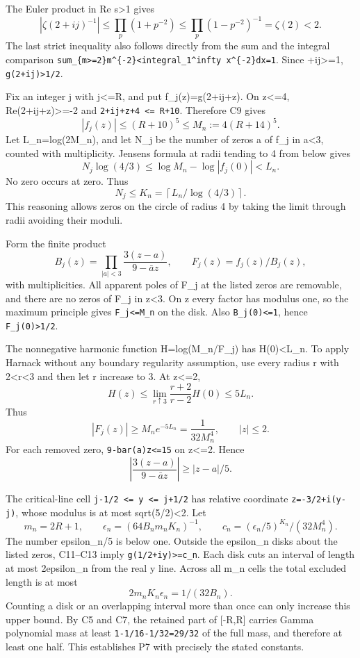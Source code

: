 \documentclass[11pt]{article}
\begin{document}
The Euler product in Re s\textgreater1 gives \[
|\zeta(2+ij)^{-1}|\le\prod_p(1+p^{-2})
 \le\prod_p(1-p^{-2})^{-1}=\zeta(2)<2.
\] The last strict inequality also follows directly from the sum and the integral comparison \texttt{sum\_\{m\textgreater{}=2\}m\^{}\{-2\}\textless{}integral\_1\^{}infty\ x\^{}\{-2\}dx=1}. Since +ij\textbar\textgreater=1, \texttt{\textbar{}g(2+ij)\textbar{}\textgreater{}1/2}.

Fix an integer j with \textbar j\textbar\textless=R, and put f\_j(z)=g(2+ij+z). On \textbar z\textbar\textless=4, Re(2+ij+z)\textgreater=-2 and \texttt{\textbar{}2+ij+z\textbar{}+4\ \textless{}=\ R+10}. Therefore C9 gives \[
|f_j(z)|\le(R+10)^5\le M_n:=4(R+14)^5.
\tag{C10}
\] Let L\_n=log(2M\_n), and let N\_j be the number of zeros a of f\_j in \textbar a\textbar\textless3, counted with multiplicity. Jensen\textquotesingle s formula at radii tending to 4 from below gives \[
N_j\log(4/3)\le\log M_n-\log|f_j(0)|<L_n.
\] No zero occurs at zero. Thus \[
N_j\le K_n=\left\lceil L_n/\log(4/3)\right\rceil.
\tag{C11}
\] This reasoning allows zeros on the circle of radius 4 by taking the limit through radii avoiding their moduli.

Form the finite product \[
B_j(z)=\prod_{|a|<3}\frac{3(z-a)}{9-\bar a z},
\qquad F_j(z)=f_j(z)/B_j(z),
\] with multiplicities. All apparent poles of F\_j at the listed zeros are removable, and there are no zeros of F\_j in \textbar z\textbar\textless3. On \textbar z every factor has modulus one, so the maximum principle gives \texttt{\textbar{}F\_j\textbar{}\textless{}=M\_n} on the disk. Also \texttt{\textbar{}B\_j(0)\textbar{}\textless{}=1}, hence \texttt{\textbar{}F\_j(0)\textbar{}\textgreater{}1/2}.

The nonnegative harmonic function H=log(M\_n/\textbar F\_j\textbar) has H(0)\textless L\_n. To apply Harnack without any boundary regularity assumption, use every radius r with 2\textless r\textless3 and then let r increase to 3. At \textbar z\textbar\textless=2, \[
H(z)\le\lim_{r\uparrow3}\frac{r+2}{r-2}H(0)
 \le5L_n.
\] Thus \[
|F_j(z)|\ge M_ne^{-5L_n}=\frac1{32M_n^4},\qquad |z|\le2.
\tag{C12}
\] For each removed zero, \texttt{\textbar{}9-bar(a)z\textbar{}\textless{}=15} on \textbar z\textbar\textless=2. Hence \[
\left|\frac{3(z-a)}{9-\bar a z}\right|\ge|z-a|/5.
\tag{C13}
\]

The critical-line cell \texttt{j-1/2\ \textless{}=\ y\ \textless{}=\ j+1/2} has relative coordinate \texttt{z=-3/2+i(y-j)}, whose modulus is at most sqrt(5/2)\textless2. Let \[
m_n=2R+1,\qquad
\epsilon_n=(64B_nm_nK_n)^{-1},\qquad
c_n=(\epsilon_n/5)^{K_n}/(32M_n^4).
\] The number epsilon\_n/5 is below one. Outside the epsilon\_n disks about the listed zeros, C11--C13 imply \texttt{\textbar{}g(1/2+iy)\textbar{}\textgreater{}=c\_n}. Each disk cuts an interval of length at most 2epsilon\_n from the real y line. Across all m\_n cells the total excluded length is at most \[
2m_nK_n\epsilon_n=1/(32B_n).
\tag{C14}
\] Counting a disk or an overlapping interval more than once can only increase this upper bound. By C5 and C7, the retained part of {[}-R,R{]} carries Gamma polynomial mass at least \texttt{1-1/16-1/32=29/32} of the full mass, and therefore at least one half. This establishes P7 with precisely the stated constants.
\end{document}
